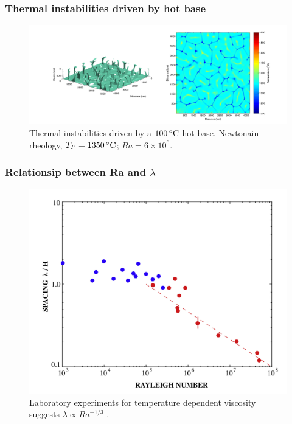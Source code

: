 \documentclass[aspectratio=169]{beamer}
\begin{document}
\begin{frame}
    \frametitle{Thermal instabilities driven by hot base}
    \begin{figure}
        \vspace{-.5cm}
        \includegraphics[width=0.85\paperwidth]{./figures/Newt100/dT1.0741_4x4_Newt_Ra6e6_7.png}
        \caption{Thermal instabilities driven by a $100\rm\,^{\circ}C$ hot base. Newtonain rheology, $T_{P}=1350\rm\,^{\circ}C$; $Ra = 6\times10^{6}$.}
    \end{figure}
\end{frame}

\begin{frame}
    \frametitle{Relationsip between Ra and $\lambda$}
    \begin{figure}
        \includegraphics[height=0.7\paperheight]{./figures/androvandi-etal-pepi-2011.jpg}
        \caption{Laboratory experiments for temperature dependent viscosity suggests $\lambda \propto Ra^{-1/3}$ \citep{androvandi-etal-2011}.}
    \end{figure}
\end{frame}
\end{document}
